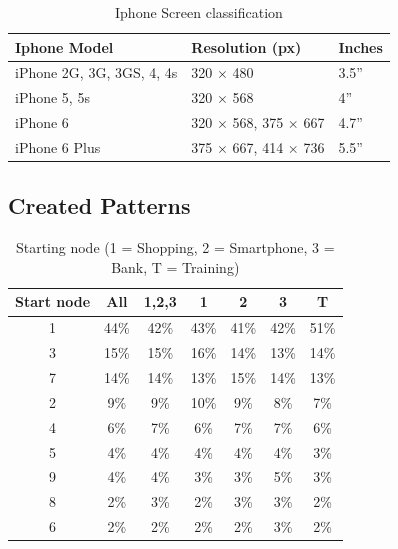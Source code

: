     \begin{table}[H]
      \centering
      \begin{tabular}{ l | l | l }
        \hline
        {\bf Iphone Model}  & {\bf Resolution (px)} & {\bf Inches} \\ \hline
        iPhone 2G, 3G, 3GS, 4, 4s  &  320 $\times$ 480  &  3.5'' \\
        iPhone 5, 5s        &  320 $\times$ 568  &  4''   \\
        iPhone 6            &  320 $\times$ 568, 375 $\times$ 667  &  4.7'' \\
        iPhone 6 Plus       &  375 $\times$ 667, 414 $\times$ 736  &  5.5'' \\ \hline        
      \end{tabular}
      \caption{Iphone Screen classification}
      \label{tab:iphonescreen}
    \end{table}

  \clearpage
	\subsection{Created Patterns} \label{sec:createdpatterns}

		\begin{table}[H]
      \centering
      \begin{tabular}{ c || c | c || c | c | c | c }
        \hline
        {\bf Start node} & All & 1,2,3 & 1 & 2 & 3 & T \\ \hline
        1 & 44\% & 42\% & 43\% & 41\% & 42\% & 51\% \\
        3 & 15\% & 15\% & 16\% & 14\% & 13\% & 14\% \\
        7 & 14\% & 14\% & 13\% & 15\% & 14\% & 13\% \\
        2 & 9\%  & 9\%  & 10\% & 9\%  & 8\%  & 7\%  \\
        4 & 6\%  & 7\%  & 6\%  & 7\%  & 7\%  & 6\%  \\
        5 & 4\%  & 4\%  & 4\%  & 4\%  & 4\%  & 3\%  \\
        9 & 4\%  & 4\%  & 3\%  & 3\%  & 5\%  & 3\%  \\
        8 & 2\%  & 3\%  & 2\%  & 3\%  & 3\%  & 2\%  \\
        6 & 2\%  & 2\%  & 2\%  & 2\%  & 3\%  & 2\%  \\ \hline
      \end{tabular}
      \caption{Starting node (1 = Shopping, 2 = Smartphone, 3 = Bank, T = Training)}
      \label{tab:startingNode}
    \end{table}

